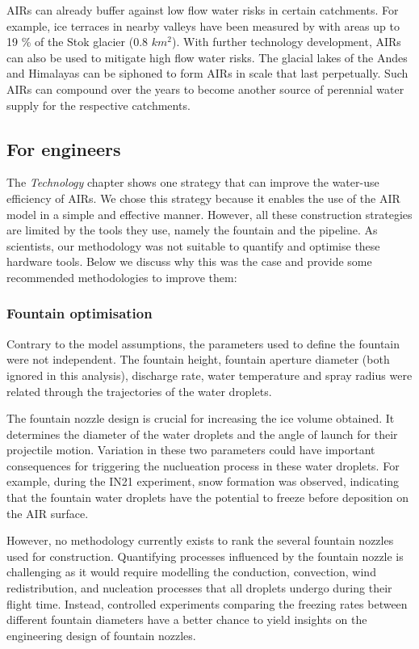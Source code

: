 \ac{AIRs} can already buffer against low flow water risks in certain catchments. For example, ice terraces in
nearby valleys have been measured by \citet{nusserSociohydrologyArtificialGlaciers2019} with areas up to 19 \%
of the Stok glacier (0.8 $km^2$). With further technology development, AIRs can also be used to mitigate high
flow water risks. The glacial lakes of the Andes and Himalayas can be siphoned to form AIRs in scale that last
perpetually. Such AIRs can compound over the years to become another source of perennial water supply for the
respective catchments.

\subsection{For engineers}

The \textit{Technology} chapter shows one strategy that can improve the water-use efficiency of \ac{AIRs}. We chose
this strategy because it enables the use of the \ac{AIR} model in a simple and effective manner. However, all these
construction strategies are limited by the tools they use, namely the fountain and the pipeline. As scientists,
our methodology was not suitable to quantify and optimise these hardware tools. Below we discuss why this was
the case and provide some recommended methodologies to improve them:

\subsubsection{Fountain optimisation}

Contrary to the model assumptions, the parameters used to define the fountain were not independent. The fountain
height, fountain aperture diameter (both ignored in this analysis), discharge rate, water temperature and spray
radius were related through the trajectories of the water droplets.

The fountain nozzle design is crucial for increasing the ice volume obtained. It determines the diameter of the
water droplets and the angle of launch for their projectile motion. Variation in these two parameters could have
important consequences for triggering the nuclueation process in these water droplets. For example, during the IN21
experiment, snow formation was observed, indicating that the fountain water droplets have the potential to
freeze before deposition on the AIR surface. 

However, no methodology currently exists to rank the several fountain nozzles used for construction. Quantifying
processes influenced by the fountain nozzle is challenging as it would require modelling the conduction,
convection, wind redistribution, and nucleation processes that all droplets undergo during their flight time.
Instead, controlled experiments comparing the freezing rates between different fountain diameters have a better
chance to yield insights on the engineering design of fountain nozzles.

